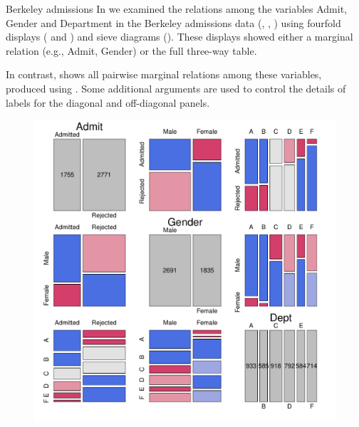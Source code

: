 \documentclass[11pt]{book}
\renewenvironment{knitrout}{\small\renewcommand{\baselinestretch}{.85}}{} %
\begin{document}
\begin{Example}[berkeley4]{Berkeley admissions}
In  we examined the
relations among the variables Admit, Gender and Department in the Berkeley
admissions data (, , ) 
using fourfold displays
( and )
and sieve diagrams ().
These displays showed either a marginal relation (e.g., Admit, Gender)
or the full three-way table.

In contrast,  shows all pairwise marginal
relations among these variables, produced using .  Some additional
arguments are used to control the details of labels for the diagonal and off-diagonal panels.
\begin{knitrout}
\color{fgcolor}\begin{kframe}
\begin{alltt}
 \hlkwb{<-} \hlstd{(} \hlstd{=} \hlstd{(} \hlstd{=} \hlstd{,}
               \hlstd{=}   \hlstd{=} \hlstd{))}
 \hlkwb{<-} \hlstd{(} \hlstd{=} \hlstd{(} \hlstd{=} \hlstd{),}  \hlstd{=} \hlopt{-}\hlstd{,}
               \hlstd{=} \hlstd{(} \hlstd{=} \hlstd{))}
  \hlstd{=} \hlstd{,}  \hlstd{=} \hlstd{,}
       
         
\end{alltt}
\end{kframe}\begin{figure}[!htb]


\centerline{\includegraphics[width=.8\textwidth]{ch05/fig/berk-pairs1} }


\end{figure}
\end{knitrout}
\end{Example}
\end{document}
